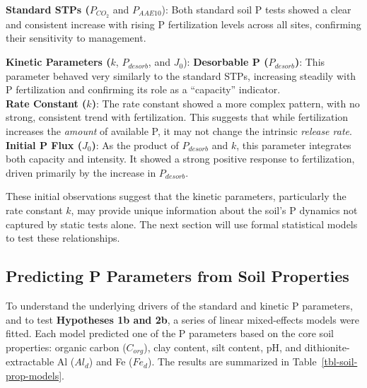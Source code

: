 \documentclass[
  a4paper,
]{article}
\begin{document}
\textbf{Standard STPs (}\(P_{CO_2}\) and \(P_{AAE10}\)): Both standard
soil P tests showed a clear and consistent increase with rising P
fertilization levels across all sites, confirming their sensitivity to
management.

\textbf{Kinetic Parameters (}\(k\), \(P_{desorb}\), and \(J_0\)):
\textbf{Desorbable P (\(P_{desorb}\))}: This parameter behaved very
similarly to the standard STPs, increasing steadily with P fertilization
and confirming its role as a ``capacity'' indicator.\\
\textbf{Rate Constant (\(k\))}: The rate constant showed a more complex
pattern, with no strong, consistent trend with fertilization. This
suggests that while fertilization increases the \emph{amount} of
available P, it may not change the intrinsic \emph{release rate}.
\textbf{Initial P Flux (\(J_0\))}: As the product of \(P_{desorb}\) and
\(k\), this parameter integrates both capacity and intensity. It showed
a strong positive response to fertilization, driven primarily by the
increase in \(P_{desorb}\).

These initial observations suggest that the kinetic parameters,
particularly the rate constant \(k\), may provide unique information
about the soil's P dynamics not captured by static tests alone. The next
section will use formal statistical models to test these relationships.

\subsection{Predicting P Parameters from Soil
Properties}\label{sec-p-params-soil-props}

To understand the underlying drivers of the standard and kinetic P
parameters, and to test \textbf{Hypotheses 1b and 2b}, a series of
linear mixed-effects models were fitted. Each model predicted one of the
P parameters based on the core soil properties: organic carbon
(\(C_{org}\)), clay content, silt content, pH, and
dithionite-extractable Al (\(Al_d\)) and Fe (\(Fe_d\)). The results are
summarized in Table~\ref{tbl-soil-prop-models}.
\end{document}
